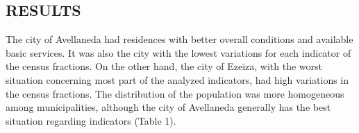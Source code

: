 \begin{multicols}{2}
\section*{RESULTS}
\par{}The city of Avellaneda had residences with better overall conditions and available basic services. It was also the city with the lowest variations for each indicator of the census fractions. On the other hand, the city of Ezeiza, with the worst situation concerning most part of the analyzed indicators, had high variations in the census fractions. The distribution of the population was more homogeneous among municipalities, although the city of Avellaneda generally has the best situation regarding indicators (Table 1).\par{}

\end{multicols}


